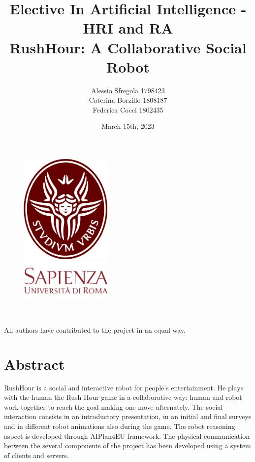 \documentclass{article}
\title{\textbf{Elective In Artificial Intelligence - HRI and RA}\\\textbf{RushHour: A Collaborative Social Robot}}
\author{Alessio Sfregola 1798423 \\ Caterina Borzillo 1808187 \\ Federica Cocci 1802435}
\date{March 15th, 2023}
\begin{document}
\maketitle

\begin{figure}[!htbp]
\centering
\includegraphics[width=0.4\textwidth]{images/logo-sapienza.png}
\\
\includegraphics[width=0.4\textwidth]{images/scritta-sapienza.png}
\label{fig:largenenough}
\end{figure}

\\
\begin{center}
All authors have contributed to the project in an equal way.
\end{center}

\newpage

\tableofcontents

\newpage

\section{Abstract}
RushHour is a social and interactive robot for people's entertainment. He plays with the human the Rush Hour game in a collaborative way: human and robot work together to reach the goal making one move alternately. The social interaction consists in an introductory presentation, in an initial and final surveys and in different robot animations also during the game. The robot reasoning aspect is developed through AIPlan4EU framework. The physical communication between the several components of the project has been developed using a system of clients and servers.
\end{document}
